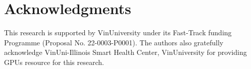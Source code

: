 \documentclass[letterpaper]{article} %
\begin{document}
\section*{Acknowledgments}
This research is supported by VinUniversity under its Fast-Track funding Programme (Proposal No. 22-0003-P0001). The authors also gratefully acknowledge VinUni-Illinois Smart Health Center, VinUniversity for providing GPUs resource for this research.     




\end{document}
